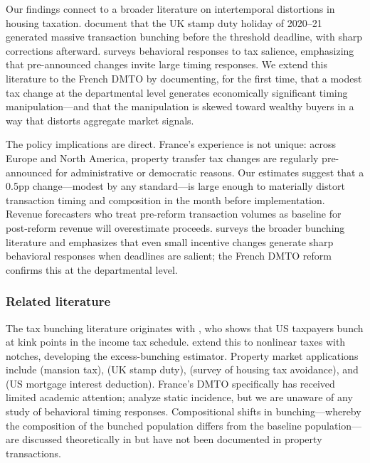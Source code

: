 \documentclass[12pt]{article}
\begin{document}
Our findings connect to a broader literature on intertemporal distortions in housing taxation.
\citet{best2018} document that the UK stamp duty holiday of 2020--21 generated massive transaction
bunching before the threshold deadline, with sharp corrections afterward. \citet{slemrod2010}
surveys behavioral responses to tax salience, emphasizing that pre-announced changes invite
large timing responses. We extend this literature to the French DMTO by documenting, for the first
time, that a modest tax change at the departmental level generates economically significant
timing manipulation---and that the manipulation is skewed toward wealthy buyers in a way that
distorts aggregate market signals.

The policy implications are direct. France's experience is not unique: across Europe and North
America, property transfer tax changes are regularly pre-announced for administrative or democratic
reasons. Our estimates suggest that a 0.5pp change—modest by any standard—is large enough to
materially distort transaction timing and composition in the month before implementation.
Revenue forecasters who treat pre-reform transaction volumes as baseline for post-reform revenue
will overestimate proceeds. \citet{kleven2016} surveys the broader bunching literature and
emphasizes that even small incentive changes generate sharp behavioral responses when deadlines
are salient; the French DMTO reform confirms this at the departmental level.

\vspace{0.5em}
\subsubsection*{Related literature}
The tax bunching literature originates with \citet{saez2010}, who shows that US taxpayers
bunch at kink points in the income tax schedule. \citet{kleven2013} extend this to nonlinear
taxes with notches, developing the excess-bunching estimator. Property market applications include
\citet{kopczuk2015} (mansion tax), \citet{best2018} (UK stamp duty), \citet{slemrod2017}
(survey of housing tax avoidance), and \citet{gruber2021} (US mortgage interest deduction).
France's DMTO specifically has received limited academic attention; \citet{trannoy2017} analyze
static incidence, but we are unaware of any study of behavioral timing responses. Compositional
shifts in bunching—whereby the composition of the bunched population differs from the baseline
population—are discussed theoretically in \citet{einav2017} but have not been documented in
property transactions.
\end{document}
